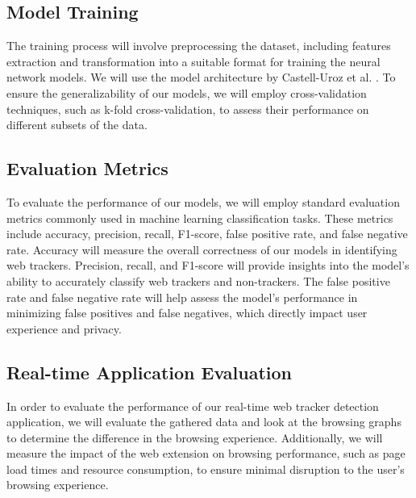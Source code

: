 \subsection{Model Training}
The training process will involve preprocessing the dataset, including features extraction and
transformation into a suitable format for training the neural network models. We will use the model architecture by Castell-Uroz et al. \cite{castell2020url}.
To ensure the generalizability of our models, we will employ cross-validation techniques, such as k-fold cross-validation,
to assess their performance on different subsets of the data.

\subsection{Evaluation Metrics}
To evaluate the performance of our models, we will employ standard evaluation metrics commonly used in machine learning
classification tasks. These metrics include accuracy, precision, recall, F1-score, false positive rate, and false negative rate.
Accuracy will measure the overall correctness of our models in identifying web trackers. Precision, recall, and F1-score will provide
insights into the model's ability to accurately classify web trackers and non-trackers. The false positive rate and false negative
rate will help assess the model's performance in minimizing false positives and false negatives, which directly impact user
experience and privacy.

\subsection{Real-time Application Evaluation}
In order to evaluate the performance of our real-time web tracker detection application, we will evaluate the gathered data 
and look at the browsing graphs to determine the difference in the browsing experience.
Additionally, we will measure the impact of the web extension on browsing performance, such as page load times and
resource consumption, to ensure minimal disruption to the user's browsing experience.





